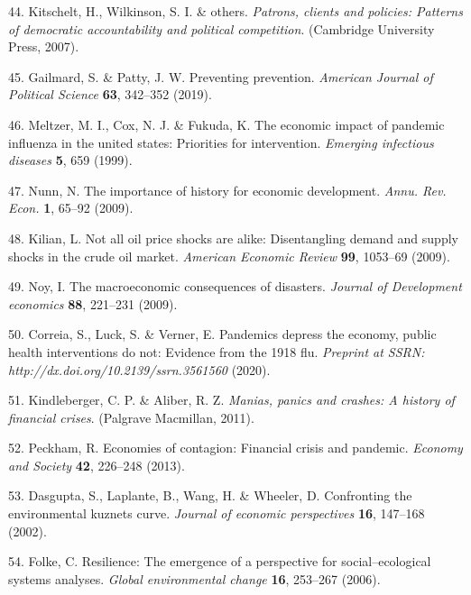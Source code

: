 \documentclass[]{article}
\begin{document}
\leavevmode\hypertarget{ref-kitschelt2007patrons}{}%
44. Kitschelt, H., Wilkinson, S. I. \& others. \emph{Patrons, clients and policies: Patterns of democratic accountability and political competition}. (Cambridge University Press, 2007).

\leavevmode\hypertarget{ref-gailmard2019preventing}{}%
45. Gailmard, S. \& Patty, J. W. Preventing prevention. \emph{American Journal of Political Science} \textbf{63}, 342--352 (2019).

\leavevmode\hypertarget{ref-meltzer1999economic}{}%
46. Meltzer, M. I., Cox, N. J. \& Fukuda, K. The economic impact of pandemic influenza in the united states: Priorities for intervention. \emph{Emerging infectious diseases} \textbf{5}, 659 (1999).

\leavevmode\hypertarget{ref-nunn2009importance}{}%
47. Nunn, N. The importance of history for economic development. \emph{Annu. Rev. Econ.} \textbf{1}, 65--92 (2009).

\leavevmode\hypertarget{ref-kilian2009not}{}%
48. Kilian, L. Not all oil price shocks are alike: Disentangling demand and supply shocks in the crude oil market. \emph{American Economic Review} \textbf{99}, 1053--69 (2009).

\leavevmode\hypertarget{ref-noy2009macroeconomic}{}%
49. Noy, I. The macroeconomic consequences of disasters. \emph{Journal of Development economics} \textbf{88}, 221--231 (2009).

\leavevmode\hypertarget{ref-correia1918pandemics}{}%
50. Correia, S., Luck, S. \& Verner, E. Pandemics depress the economy, public health interventions do not: Evidence from the 1918 flu. \emph{Preprint at SSRN: http://dx.doi.org/10.2139/ssrn.3561560} (2020).

\leavevmode\hypertarget{ref-kindleberger2011manias}{}%
51. Kindleberger, C. P. \& Aliber, R. Z. \emph{Manias, panics and crashes: A history of financial crises}. (Palgrave Macmillan, 2011).

\leavevmode\hypertarget{ref-peckham2013economies}{}%
52. Peckham, R. Economies of contagion: Financial crisis and pandemic. \emph{Economy and Society} \textbf{42}, 226--248 (2013).

\leavevmode\hypertarget{ref-dasgupta2002confronting}{}%
53. Dasgupta, S., Laplante, B., Wang, H. \& Wheeler, D. Confronting the environmental kuznets curve. \emph{Journal of economic perspectives} \textbf{16}, 147--168 (2002).

\leavevmode\hypertarget{ref-folke2006resilience}{}%
54. Folke, C. Resilience: The emergence of a perspective for social--ecological systems analyses. \emph{Global environmental change} \textbf{16}, 253--267 (2006).
\end{document}
